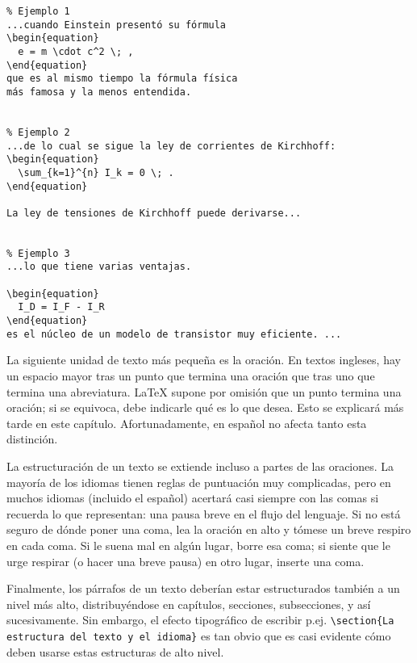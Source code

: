 \begin{code}
\begin{verbatim}
% Ejemplo 1
...cuando Einstein presentó su fórmula 
\begin{equation} 
  e = m \cdot c^2 \; , 
\end{equation} 
que es al mismo tiempo la fórmula física 
más famosa y la menos entendida.


% Ejemplo 2
...de lo cual se sigue la ley de corrientes de Kirchhoff:
\begin{equation} 
  \sum_{k=1}^{n} I_k = 0 \; .
\end{equation} 

La ley de tensiones de Kirchhoff puede derivarse...


% Ejemplo 3
...lo que tiene varias ventajas.

\begin{equation} 
  I_D = I_F - I_R
\end{equation} 
es el núcleo de un modelo de transistor muy eficiente. ...
\end{verbatim}
\end{code} 

La siguiente unidad de texto más pequeña es la oración.  En textos ingleses, hay un espacio mayor tras un punto que termina una oración que tras uno que termina una abreviatura.  \LaTeX{} supone por omisión que un punto termina una oración; si se equivoca, debe indicarle qué es lo que desea.  Esto se explicará más tarde en este capítulo.  Afortunadamente, en español no afecta tanto esta distinción.

La estructuración de un texto se extiende incluso a partes de las oraciones.  La mayoría de los idiomas tienen reglas de puntuación muy complicadas, pero en muchos idiomas (incluido el español) acertará casi siempre con las comas si recuerda lo que representan: una pausa breve en el flujo del lenguaje.  Si no está seguro de dónde poner una coma, lea la oración en alto y tómese un breve respiro en cada coma. Si le suena mal en algún lugar, borre esa coma; si siente que le urge respirar (o hacer una breve pausa) en otro lugar, inserte una coma.

Finalmente, los párrafos de un texto deberían estar estructurados también a un nivel más alto, distribuyéndose en capítulos, secciones, subsecciones, y así sucesivamente.  Sin embargo, el efecto tipográfico de escribir p.ej.{} \verb|\section{La| \texttt{estructura del texto y el idioma}\verb|}| es tan obvio que es casi evidente cómo deben usarse estas estructuras de alto nivel.

